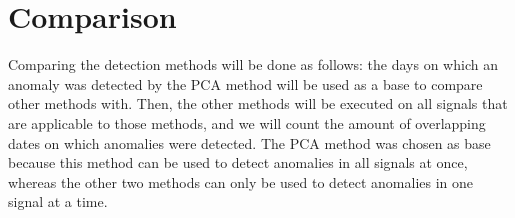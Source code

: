 \documentclass[]{article}
\begin{document}
\section{Comparison}
Comparing the detection methods will be done as follows: the days on which an anomaly was detected by the PCA method will be used as a base to compare other methods with. Then, the other methods will be executed on all signals that are applicable to those methods, and we will count the amount of overlapping dates on which anomalies were detected. The PCA method was chosen as base because this method can be used to detect anomalies in all signals at once, whereas the other two methods can only be used to detect anomalies in one signal at a time.
\clearpage


\end{document}
